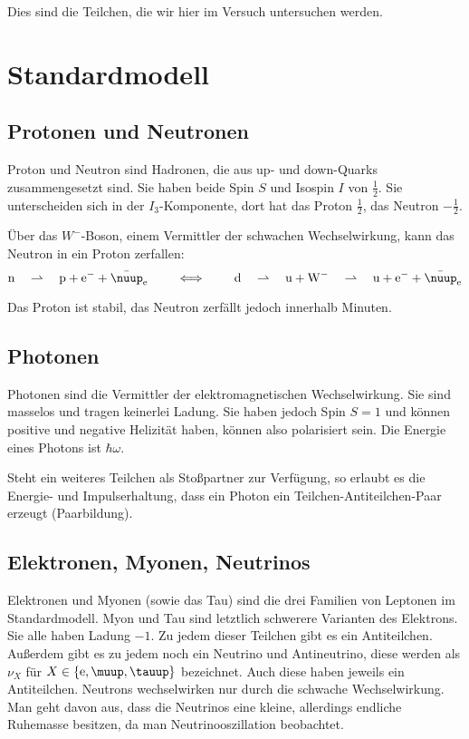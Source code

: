 \documentclass[11pt, ngerman, fleqn, DIV=15, headinclude, BCOR=2cm]{scrreprt}
\begin{document}
Dies sind die Teilchen, die wir hier im Versuch untersuchen werden.

\section{Standardmodell}

\subsection{Protonen und Neutronen}

Proton und Neutron sind Hadronen, die aus up- und down-Quarks zusammengesetzt
sind. Sie haben beide Spin $S$ und Isospin $I$ von $\frac12$. Sie unterscheiden
sich in der $I_3$-Komponente, dort hat das Proton $\frac12$, das Neutron
$-\frac12$.

Über das $W^-$-Boson, einem Vermittler der schwachen Wechselwirkung, kann das
Neutron in ein Proton zerfallen:
\[
    \mathrm n \quad\rightharpoonup\quad \mathrm p + \mathrm e^- + \bar
    \nuup_\mathrm e
    \qquad\iff\qquad
    \mathrm d
    \quad\rightharpoonup\quad
    \mathrm u + \mathrm W^-
    \quad\rightharpoonup\quad
    \mathrm u
    + \mathrm e^- + \bar \nuup_\mathrm e
\]

Das Proton ist stabil, das Neutron zerfällt jedoch innerhalb Minuten.

\subsection{Photonen}

Photonen sind die Vermittler der elektromagnetischen Wechselwirkung. Sie sind
masselos und tragen keinerlei Ladung. Sie haben jedoch Spin $S = 1$ und können
positive und negative Helizität haben, können also polarisiert sein. Die
Energie eines Photons ist $\hbar \omega$.

Steht ein weiteres Teilchen als Stoßpartner zur Verfügung, so erlaubt es die
Energie- und Impulserhaltung, dass ein Photon ein Teilchen-Antiteilchen-Paar
erzeugt (Paarbildung).

\subsection{Elektronen, Myonen, Neutrinos}

Elektronen und Myonen (sowie das Tau) sind die drei Familien von Leptonen im
Standardmodell. Myon und Tau sind letztlich schwerere Varianten des Elektrons.
Sie alle haben Ladung $-1$. Zu jedem dieser Teilchen gibt es ein Antiteilchen.
Außerdem gibt es zu jedem noch ein Neutrino und Antineutrino, diese werden als
$\nu_X$ für $X \in \{ \eup, \muup, \tauup \}$ bezeichnet. Auch diese haben
jeweils ein Antiteilchen. Neutrons wechselwirken nur durch die schwache
Wechselwirkung. Man geht davon aus, dass die Neutrinos eine kleine, allerdings
endliche Ruhemasse besitzen, da man Neutrinooszillation beobachtet.
\end{document}

